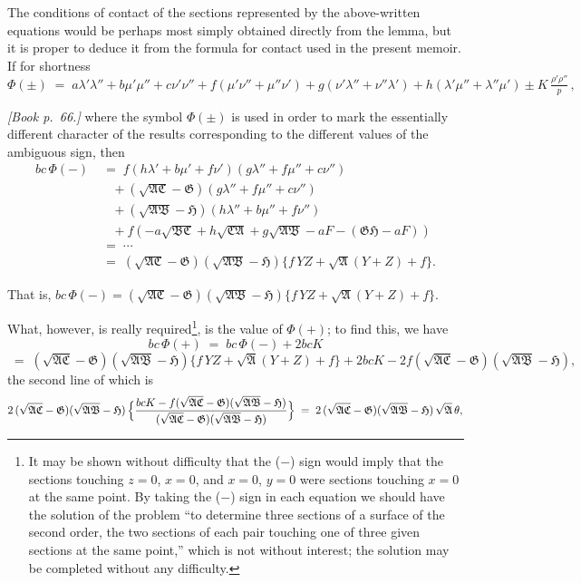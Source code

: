 \documentclass[11pt]{article}
\providecommand{\fA}{\mathfrak{A}}
\providecommand{\fB}{\mathfrak{B}}
\providecommand{\fC}{\mathfrak{C}}
\providecommand{\fG}{\mathfrak{G}}
\providecommand{\fH}{\mathfrak{H}}
\begin{document}
The conditions of contact of the sections represented by the above-written equations would be perhaps most simply obtained directly from the lemma, but it is proper to deduce it from the formula for contact used in the present memoir. If for shortness
\[
\Phi(\pm) \;=\; a\lambda'\lambda'' + b\mu'\mu'' + c\nu'\nu'' + f(\mu'\nu'' + \mu''\nu') + g(\nu'\lambda'' + \nu''\lambda') + h(\lambda'\mu'' + \lambda''\mu') \pm K\,\tfrac{\rho'\rho''}{p}\,,
\]

\bigskip

\noindent\emph{[Book p.~66.]} where the symbol $\Phi(\pm)$ is used in order to mark the essentially different character of the results corresponding to the different values of the ambiguous sign, then
\begin{align*}
bc\,\Phi(-) &\;=\; f(h\lambda' + b\mu' + f\nu')(g\lambda'' + f\mu'' + c\nu'')\\
            &\quad + (\sqrt{\fA\fC} - \fG)(g\lambda'' + f\mu'' + c\nu'')\\
            &\quad + (\sqrt{\fA\fB} - \fH)(h\lambda'' + b\mu'' + f\nu'')\\
            &\quad + f(-a\sqrt{\fB\fC} + h\sqrt{\fC\fA} + g\sqrt{\fA\fB} - aF - (\fG\fH - aF))\\
            &\;=\; \cdots \\
            &\;=\; (\sqrt{\fA\fC} - \fG)(\sqrt{\fA\fB} - \fH)\{f\,YZ + \sqrt{\fA}(Y + Z) + f\}.
\end{align*}

That is, $bc\,\Phi(-) = (\sqrt{\fA\fC} - \fG)(\sqrt{\fA\fB} - \fH)\{f\,YZ + \sqrt{\fA}(Y + Z) + f\}$.

What, however, is really required\footnote{It may be shown without difficulty that the ($-$) sign would imply that the sections touching $z = 0$, $x = 0$, and $x = 0$, $y = 0$ were sections touching $x = 0$ at the same point. By taking the ($-$) sign in each equation we should have the solution of the problem ``to determine three sections of a surface of the second order, the two sections of each pair touching one of three given sections at the same point,'' which is not without interest; the solution may be completed without any difficulty.}, is the value of $\Phi(+)$; to find this, we have
\[
bc\,\Phi(+) \;=\; bc\,\Phi(-) + 2bcK
\]
\[
\;=\; (\sqrt{\fA\fC} - \fG)(\sqrt{\fA\fB} - \fH)\{f\,YZ + \sqrt{\fA}(Y + Z) + f\} + 2bcK - 2f(\sqrt{\fA\fC} - \fG)(\sqrt{\fA\fB} - \fH),
\]
the second line of which is
\[
2\,(\sqrt{\fA\fC} - \fG)(\sqrt{\fA\fB} - \fH)\,\Bigl\{\frac{bcK - f(\sqrt{\fA\fC} - \fG)(\sqrt{\fA\fB} - \fH)}{(\sqrt{\fA\fC} - \fG)(\sqrt{\fA\fB} - \fH)}\Bigr\}
\;=\; 2\,(\sqrt{\fA\fC} - \fG)(\sqrt{\fA\fB} - \fH)\,\sqrt{\fA}\,\theta,
\]
\end{document}
